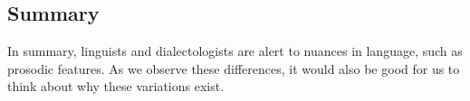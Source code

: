 \documentclass[../main.tex]{subfiles}
\begin{document}

        \subsection{Summary}
        In summary, linguists and dialectologists are alert to nuances in language, such as prosodic features. As we observe these differences, it would also be good for us to think about why these variations exist.
\end{document}
